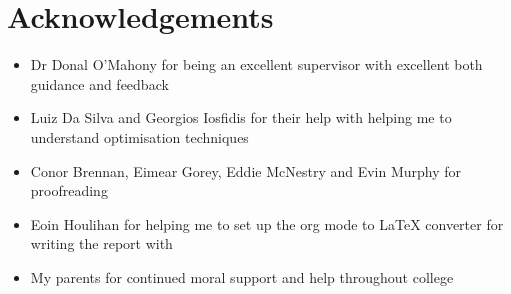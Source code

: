 \chapter*{Acknowledgements}

\begin{itemize}
  \item Dr Donal O'Mahony for being an excellent supervisor with excellent both guidance and feedback
  \item Luiz Da Silva and Georgios Iosfidis for their help with helping me to understand
optimisation techniques
  \item Conor Brennan, Eimear Gorey, Eddie McNestry and Evin Murphy for proofreading
  \item Eoin Houlihan for helping me to set up the org mode to LaTeX converter
    for writing the report with 
  \item My parents for continued moral support and help throughout college
\end{itemize}